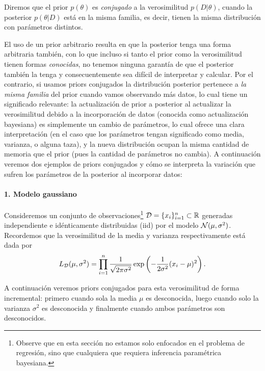 \begin{definition}
	Diremos que el prior $p(\theta)$ es \emph{conjugado} a la verosimilitud $p(D|\theta)$, cuando la posterior $p(\theta|D)$ está en la misma familia, es decir, tienen la misma distribución con parámetros distintos.   
\end{definition}

El uso de un prior arbitrario resulta en que la posterior tenga una forma arbitraria también, con lo que incluso si tanto el prior como la verosimilitud tienen formas \emph{conocidas}, no tenemos ninguna garantía de que el posterior también la tenga y consecuentemente sea difícil de interpretar y calcular. Por el contrario, si usamos priors conjugados la distribución posterior pertenece a \emph{la misma familia} del prior cuando vamos observando más datos, lo cual tiene un significado relevante: la actualización de prior a posterior al actualizar la verosimilitud debido a la incorporación de datos (conocida como actualización bayesiana) es simplemente un cambio de parámetros, lo cual ofrece una clara interpretación (en el caso que los parámetros tengan significado como media, varianza, o alguna taza), y la nueva distribución ocupan la misma cantidad de memoria que el prior (pues la cantidad de parámetros no cambia). A continuación veremos dos ejemplos de priors conjugados y cómo se interpreta la variación que sufren los parámetros de la posterior al incorporar datos:

\paragraph{1. Modelo gaussiano}

Consideremos un conjunto de observaciones\footnote{Observe que en esta sección no estamos solo enfocados en el problema de regresión, sino que cualquiera que requiera inferencia paramétrica bayesiana.} ${\mathcal D}=\{x_i\}_{i=1}^n\subset\mathbb{R}$ generadas independiente e idénticamente distribuidas (iid) por el modelo ${\mathcal N}(\mu,\sigma^2)$. Recordemos que la verosimilitud de la media y varianza respectivamente está dada por 
\begin{equation}
	L_{\mathcal D}(\mu, \sigma^2) = \prod_{i=1}^n \frac{1}{\sqrt{2\pi\sigma^2}}\exp\left(-\frac{1}{2\sigma^2}(x_i-\mu)^2\right).
 \end{equation}

A continuación veremos priors conjugados para esta verosimilitud de forma incremental: primero cuando sola la media $\mu$ es desconocida, luego cuando solo la varianza $\sigma^2$ es desconocida y finalmente cuando ambos parámetros son desconocidos.  


